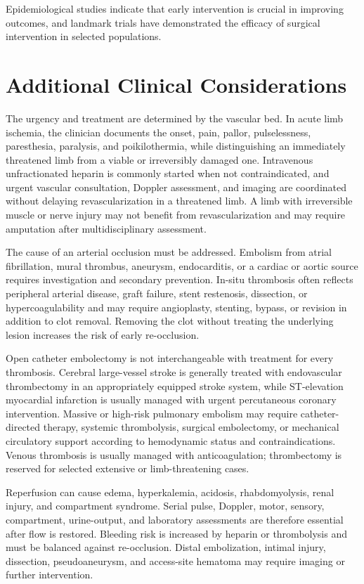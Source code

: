 Epidemiological studies indicate that early intervention is crucial in improving outcomes, and landmark trials have demonstrated the efficacy of surgical intervention in selected populations.

\section*{Additional Clinical Considerations}
The urgency and treatment are determined by the vascular bed. In acute limb ischemia, the clinician documents the onset, pain, pallor, pulselessness, paresthesia, paralysis, and poikilothermia, while distinguishing an immediately threatened limb from a viable or irreversibly damaged one. Intravenous unfractionated heparin is commonly started when not contraindicated, and urgent vascular consultation, Doppler assessment, and imaging are coordinated without delaying revascularization in a threatened limb. A limb with irreversible muscle or nerve injury may not benefit from revascularization and may require amputation after multidisciplinary assessment.

The cause of an arterial occlusion must be addressed. Embolism from atrial fibrillation, mural thrombus, aneurysm, endocarditis, or a cardiac or aortic source requires investigation and secondary prevention. In-situ thrombosis often reflects peripheral arterial disease, graft failure, stent restenosis, dissection, or hypercoagulability and may require angioplasty, stenting, bypass, or revision in addition to clot removal. Removing the clot without treating the underlying lesion increases the risk of early re-occlusion.

Open catheter embolectomy is not interchangeable with treatment for every thrombosis. Cerebral large-vessel stroke is generally treated with endovascular thrombectomy in an appropriately equipped stroke system, while ST-elevation myocardial infarction is usually managed with urgent percutaneous coronary intervention. Massive or high-risk pulmonary embolism may require catheter-directed therapy, systemic thrombolysis, surgical embolectomy, or mechanical circulatory support according to hemodynamic status and contraindications. Venous thrombosis is usually managed with anticoagulation; thrombectomy is reserved for selected extensive or limb-threatening cases.

Reperfusion can cause edema, hyperkalemia, acidosis, rhabdomyolysis, renal injury, and compartment syndrome. Serial pulse, Doppler, motor, sensory, compartment, urine-output, and laboratory assessments are therefore essential after flow is restored. Bleeding risk is increased by heparin or thrombolysis and must be balanced against re-occlusion. Distal embolization, intimal injury, dissection, pseudoaneurysm, and access-site hematoma may require imaging or further intervention.

